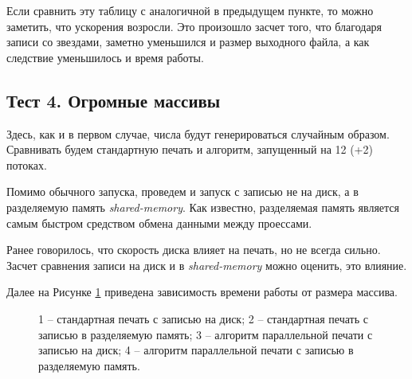 Если сравнить эту таблицу с аналогичной в предыдущем пункте, то можно заметить, что ускорения возросли.
Это произошло засчет того, что благодаря записи со звездами, заметно уменьшился и размер выходного файла, а как следствие уменьшилось и время работы.

\subsection{Тест 4. Огромные массивы} \label{subsec2:3}
Здесь, как и в первом случае, числа будут генерироваться случайным образом.
Сравнивать будем стандартную печать и алгоритм, запущенный на 12 (+2) потоках.

Помимо обычного запуска, проведем и запуск с записью не на диск, а в разделяемую память \textit{shared-memory}.
Как известно, разделяемая память является самым быстром средством обмена данными между проессами.

Ранее говорилось, что скорость диска влияет на печать, но не всегда сильно.
Засчет сравнения записи на диск и в \textit{shared-memory} можно оценить, это влияние.

Далее на Рисунке \ref{grap} приведена зависимость времени работы от размера массива.
\begin{figure}[h!]
\caption{
1 -- стандартная печать с записью на диск;
2 -- стандартная печать с записью в разделяемую память;
3 -- алгоритм параллельной печати с записью на диск;
4 -- алгоритм параллельной печати с записью в разделяемую память.} \label{grap}
\end{figure}


